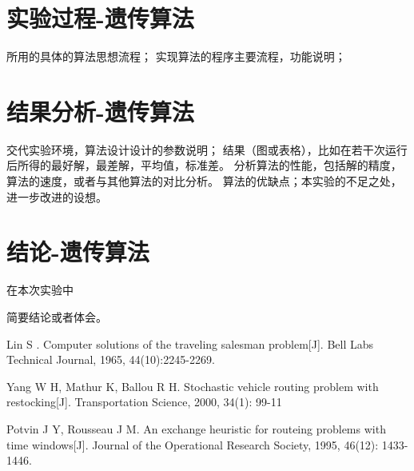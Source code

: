 \documentclass[withoutpreface,bwprint]{cumcmthesis} %
\begin{document}
\section{实验过程-遗传算法}
   所用的具体的算法思想流程；
   实现算法的程序主要流程，功能说明；

\section{结果分析-遗传算法}
   交代实验环境，算法设计设计的参数说明；
   结果（图或表格），比如在若干次运行后所得的最好解，最差解，平均值，标准差。
   分析算法的性能，包括解的精度，算法的速度，或者与其他算法的对比分析。
   算法的优缺点；本实验的不足之处，进一步改进的设想。
\section{结论-遗传算法}
	在本次实验中
	
	
   简要结论或者体会。

%
\begin{thebibliography}{99}
	 Lin S . Computer solutions of the traveling salesman problem[J]. Bell Labs Technical Journal, 1965, 44(10):2245-2269.
	
	 Yang W H, Mathur K, Ballou R H. Stochastic vehicle routing problem with restocking[J]. Transportation Science, 2000, 34(1): 99-11
	
	 Potvin J Y, Rousseau J M. An exchange heuristic for routeing problems with time windows[J]. Journal of the Operational Research Society, 1995, 46(12): 1433-1446.

\end{thebibliography}
\end{document}
